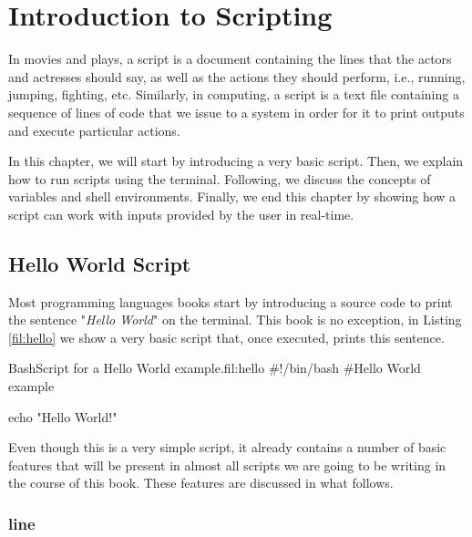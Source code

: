 \chapter{Introduction to Scripting}\label{ch:intro_scripting}

In movies and plays, a script is a document containing the lines that the actors and actresses should say, as well as the actions they should perform, i.e., running, jumping, fighting, etc. Similarly, in computing, a script is a text file containing a sequence of lines of code that we issue to a system in order for it to print outputs and execute particular actions.

In this chapter, we will start by introducing a very basic script. Then, we explain how to run scripts using the terminal. Following, we discuss the concepts of variables and shell environments. Finally, we end this chapter by showing how a script can work with inputs provided by the user in real-time.


\section{Hello World Script}

Most programming languages books start  by introducing a source code to print the sentence "\textit{Hello World}" on the terminal. This book is no exception, in Listing \ref{fil:hello} we show a very basic  script that, once executed, prints this sentence.

\begin{source_code_float}{Bash}{Script for a Hello World example.}{fil:hello}
#!/bin/bash
#Hello World example

echo "Hello World!"
\end{source_code_float}

Even though this is a very simple script, it already contains a number of basic features that will be present in almost all  scripts we are going to be writing in the course of this book. These features are discussed in what follows.

\subsection{ line}

